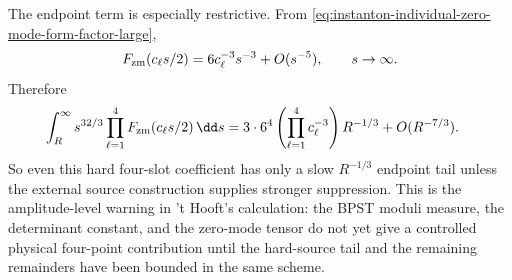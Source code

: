 \begin{controlledapproximation}
The endpoint term is especially restrictive.  From
\eqref{eq:instanton-individual-zero-mode-form-factor-large},
\[
  F_{\rm zm}(c_\ell s/2)
  =
  6c_\ell^{-3}s^{-3}+O(s^{-5}),
  \qquad s\to\infty .
\]
Therefore
\begin{equation}
\begin{aligned}
  \int_R^\infty
  s^{32/3}\prod_{\ell=1}^{4}F_{\rm zm}(c_\ell s/2)\,\dd s
  &=
  3\cdot6^4
  \left(\prod_{\ell=1}^{4}c_\ell^{-3}\right)R^{-1/3}
  +O(R^{-7/3}).
\end{aligned}
  \label{eq:su3-nf2-hard-tail-asymptotic}
\end{equation}
So even this hard four-slot coefficient has only a slow \(R^{-1/3}\) endpoint
tail unless the external source construction supplies stronger suppression.
This is the amplitude-level warning in 't Hooft's calculation: the BPST
moduli measure, the determinant constant, and the zero-mode tensor do not yet
give a controlled physical four-point contribution until the hard-source tail
and the remaining remainders have been bounded in the same scheme.
\end{controlledapproximation}

